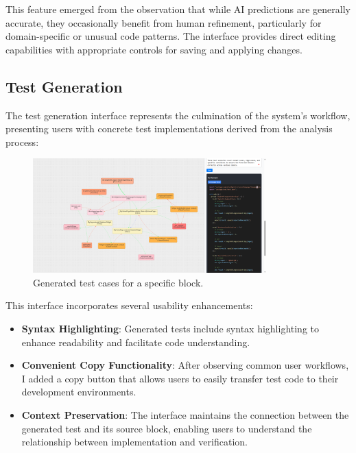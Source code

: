 This feature emerged from the observation that while AI predictions are generally accurate, they occasionally benefit from human refinement, particularly for domain-specific or unusual code patterns. The interface provides direct editing capabilities with appropriate controls for saving and applying changes.

\subsection{Test Generation}

The test generation interface represents the culmination of the system's workflow, presenting users with concrete test implementations derived from the analysis process:

\begin{figure}[H]
    \centering
    \includegraphics[width=0.8\textwidth]{images/generated_test.png}
    \caption{Generated test cases for a specific block.}
    \label{fig:generated-test}
\end{figure}

This interface incorporates several usability enhancements:

\begin{itemize}
    \item \textbf{Syntax Highlighting}: Generated tests include syntax highlighting to enhance readability and facilitate code understanding.
    
    \item \textbf{Convenient Copy Functionality}: After observing common user workflows, I added a copy button that allows users to easily transfer test code to their development environments.
    
    \item \textbf{Context Preservation}: The interface maintains the connection between the generated test and its source block, enabling users to understand the relationship between implementation and verification.
\end{itemize}


